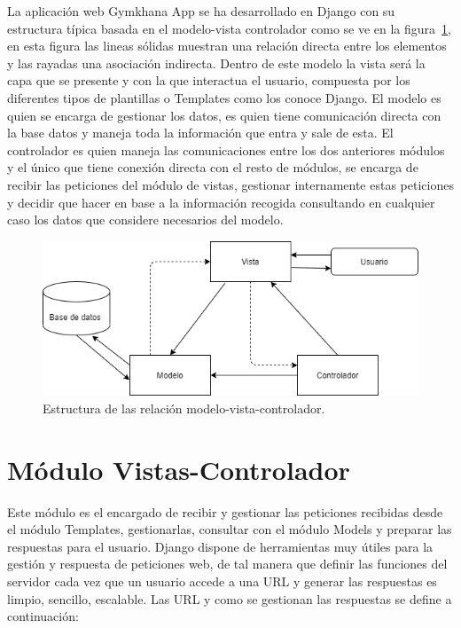 \documentclass[a4paper, 12pt]{book}
\begin{document}
La aplicación web Gymkhana App se ha desarrollado en Django con su estructura típica basada en el modelo-vista controlador como se ve en la figura~\ref{fig:arquitectura}, en esta figura las lineas sólidas muestran una relación directa entre los elementos y las rayadas una asociación indirecta. Dentro de este modelo  la vista será la capa que se presente y con la que interactua el usuario, compuesta por los diferentes tipos de plantillas o Templates como los conoce Django. El modelo es quien se encarga de gestionar los datos, es quien tiene comunicación directa con la base datos y maneja toda la información que entra y sale de esta. El controlador es quien maneja las comunicaciones entre los dos anteriores módulos y el único que tiene conexión directa con el resto de módulos, se encarga de recibir las peticiones del módulo de vistas, gestionar internamente estas peticiones y decidir que hacer en base a la información recogida consultando en cualquier caso los datos que considere necesarios del modelo. 

\begin{figure}
	\centering
	\includegraphics[width=12cm, keepaspectratio]{img/model-vista-controlador.png}
	\caption{Estructura de las relación modelo-vista-controlador.}\label{fig:arquitectura}
\end{figure}

\section{Módulo Vistas-Controlador}
Este módulo es el encargado de recibir y gestionar las peticiones recibidas desde el módulo Templates, gestionarlas, consultar con el módulo Models y preparar las respuestas para el usuario. Django dispone de herramientas muy útiles para la gestión y respuesta de peticiones web, de tal manera que definir las funciones del servidor cada vez que un usuario accede a una URL y generar las respuestas es limpio, sencillo, escalable. 
Las URL y como se gestionan las respuestas se define a continuación: 
\end{document}
